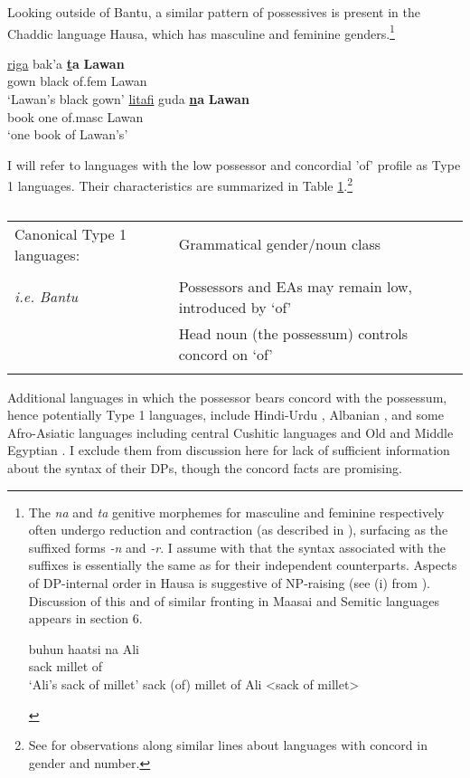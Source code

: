 \documentclass[output=paper
,modfonts
,nonflat]{langsci/langscibook}
\begin{document}
Looking outside of Bantu, a similar pattern of possessives is present in the Chaddic language Hausa, which has masculine and feminine genders.\footnote{The \textit{na} and \textit{ta} genitive morphemes for masculine and feminine respectively often undergo reduction and contraction (as described in \citealt{Tuller1986}), surfacing as the suffixed forms \textit{-n} and \textit{-r}. I assume with \citet{Tuller1986} that the syntax associated with the suffixes is essentially the same as for their independent counterparts. Aspects of DP-internal order in Hausa is suggestive of NP-raising (see (i) from \citealt[30]{Tuller1986}). Discussion of this and of similar fronting in Maasai and Semitic languages appears in section 6.
\begin{exe}
	\ex 
	\xlist
	\ex 
	\gll buhun haatsi na Ali\\
	sack     millet  of\\
	\glt `Ali's sack of millet'  	
	\ex {\lbrack}sack (of) millet{\rbrack} of Ali <sack of millet>
	
	\endxlist
\end{exe}}

\begin{exe}
	\ex \label{ex:12} \citep[301]{Newman2000}
	\xlist
	\ex 
	\gll \underline{riga}   bak’a   \textbf{\underline{t}a}       \textbf{Lawan} \\
	gown   black   of.fem    Lawan\\
	\glt `Lawan’s black gown'  	
	\ex 
	\gll \underline{litafi}     guda \textbf{\underline{n}a}       \textbf{Lawan}\\
	book one  of.masc  Lawan\\
	\glt `one book of Lawan's'
	\endxlist
\end{exe}
I will refer to languages with the low possessor and concordial 'of' profile as Type 1 languages. Their characteristics are summarized in Table \ref{tab:1}.\footnote{See \citealt{Giusti2008} for observations along similar lines about languages with concord in gender and number.} 
\begin{table}
	\caption{}
	\label{tab:1}
	\begin{tabularx}{\textwidth}{lX}
		\lsptoprule
		Canonical Type 1 languages: & Grammatical gender/noun class\\ \\
		\textit{i.e. Bantu} & Possessors and EAs may remain low, introduced by ‘of’\\
		& Head noun (the possessum) controls concord on ‘of’\\
		\lspbottomrule
	\end{tabularx}
\end{table} \newpage \noindent
Additional languages in which the possessor bears concord with the possessum, hence potentially Type 1 languages, include Hindi-Urdu \citep{Bogel_Butt2013}, Albanian \citep{Spencer2007}, and some Afro-Asiatic languages including central Cushitic languages \citep{Hetzron1995} and Old and Middle Egyptian \citep{Haspelmath2015}. I exclude them from discussion here for lack of sufficient information about the syntax of their DPs, though the concord facts are promising.
\end{document}
